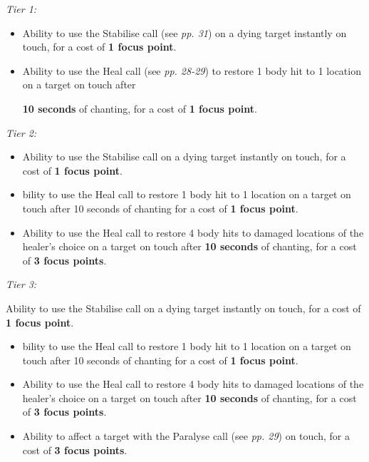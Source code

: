\textit{Tier 1:}

\begin{itemize}
\item Ability to use the Stabilise call (see \textit{pp. 31}) on a dying target instantly on touch, for a cost of \textbf{1 focus point}.

\item Ability to use the Heal call (see \textit{pp. 28-29}) to restore 1 body hit to 1 location on a target on touch after

\textbf{10 seconds} of chanting, for a cost of \textbf{1 focus point}.

\end{itemize}
\textit{Tier 2:}

\begin{itemize}
\item Ability to use the Stabilise call on a dying target instantly on touch, for a cost of \textbf{1 focus point}.

\item bility to use the Heal call to restore 1 body hit to 1 location on a target on touch after 10 seconds of chanting for a cost of \textbf{1 focus point}.

\item Ability to use the Heal call to restore 4 body hits to damaged locations of the healer's choice on a target on touch after \textbf{10 seconds} of chanting, for a cost of \textbf{3 focus points}.

\end{itemize}
\textit{Tier 3:}

Ability to use the Stabilise call on a dying target instantly on touch, for a cost of \textbf{1 focus point}.

\begin{itemize}
\item bility to use the Heal call to restore 1 body hit to 1 location on a target on touch after 10 seconds of chanting for a cost of \textbf{1 focus point}.

\item Ability to use the Heal call to restore 4 body hits to damaged locations of the healer's choice on a target on touch after \textbf{10 seconds} of chanting, for a cost of \textbf{3 focus points}.

\item Ability to affect a target with the Paralyse call (see \textit{pp. 29}) on touch, for a cost of \textbf{3 focus points}.

\end{itemize}
